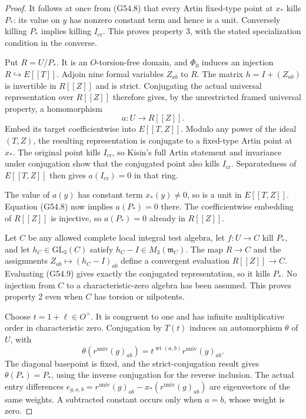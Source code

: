 \begin{proof}
It follows at once from (G54.8) that every Artin fixed-type
point at $x_*$ kills $P_*$: its value on $y$ has nonzero
constant term and hence is a unit.  Conversely killing
$P_*$ implies killing $I_{\mathrm{cr}}$.  This proves
property 3, with the stated specialization condition in
the converse.

Put $R=U/P_*$.  It is an $O$-torsion-free domain, and
$\Phi_0$ induces an injection $R\hookrightarrow E[[T]]$.
Adjoin nine formal variables $Z_{ab}$ to $R$.
The matrix $h=I+(Z_{ab})$ is invertible in $R[[Z]]$ and
is strict.  Conjugating the actual universal representation
over $R[[Z]]$ therefore gives, by the unrestricted framed
universal property, a homomorphism
\[
                      a:U\longrightarrow R[[Z]].             \tag{G54.9}
\]
Embed its target coefficientwise into $E[[T,Z]]$.
Modulo any power of the ideal $(T,Z)$, the resulting
representation is conjugate to a fixed-type Artin point
at $x_*$.  The original point kills $I_{\mathrm{cr}}$,
so Kisin's full Artin statement and invariance under
conjugation show that the conjugated point also kills
$I_{\mathrm{cr}}$.
Separatedness of $E[[T,Z]]$ then gives
$a(I_{\mathrm{cr}})=0$ in that ring.

The value of $a(y)$ has constant term $x_*(y)\ne0$,
so is a unit in $E[[T,Z]]$.
Equation (G54.8) now implies $a(P_*)=0$ there.
The coefficientwise embedding of $R[[Z]]$ is injective,
so $a(P_*)=0$ already in $R[[Z]]$.

Let $C$ be any allowed complete local integral test
algebra, let $f:U\to C$ kill $P_*$, and let
$h_C\in\mathrm{GL}_3(C)$ satisfy $h_C-I\in M_3(\mathfrak m_C)$.
The map $R\to C$ and the assignments
$Z_{ab}\mapsto(h_C-I)_{ab}$ define a convergent evaluation
$R[[Z]]\to C$.  Evaluating (G54.9) gives exactly the
conjugated representation, so it kills $P_*$.
No injection from $C$ to a characteristic-zero algebra
has been assumed.  This proves property 2 even when
$C$ has torsion or nilpotents.

Choose $t=1+\ell\in O^\times$.  It is congruent to one
and has infinite multiplicative order in characteristic
zero.  Conjugation by $T(t)$ induces an automorphism
$\theta$ of $U$, with
\[
 \theta(r^{\mathrm{univ}}(g)_{ab})
          =t^{\operatorname{wt}(a,b)}r^{\mathrm{univ}}(g)_{ab}.
                                                               \tag{G54.10}
\]
The diagonal basepoint is fixed, and the strict-conjugation
result gives $\theta(P_*)=P_*$, using the inverse
conjugation for the reverse inclusion.
The actual entry differences
$e_{g,a,b}=r^{\mathrm{univ}}(g)_{ab}-x_*(r^{\mathrm{univ}}(g)_{ab})$
are eigenvectors of the same weights.  A subtracted
constant occurs only when $a=b$, whose weight is zero.


\end{proof}
